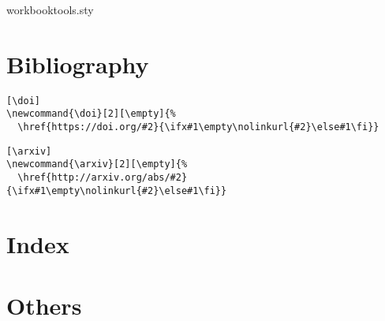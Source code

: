 \documentclass{article}
\begin{document}
\begin{package}{workbooktools.sty}
\section{Bibliography}

\begin{verbatim}[\doi]
\newcommand{\doi}[2][\empty]{%
  \href{https://doi.org/#2}{\ifx#1\empty\nolinkurl{#2}\else#1\fi}}
\end{verbatim}

\begin{verbatim}[\arxiv]
\newcommand{\arxiv}[2][\empty]{%
  \href{http://arxiv.org/abs/#2}{\ifx#1\empty\nolinkurl{#2}\else#1\fi}}
\end{verbatim}


\section{Index}

\begin{source}
\end{source}


\section{Others}

\begin{source}
\endinput
\end{source}
\end{package}
\end{document}
